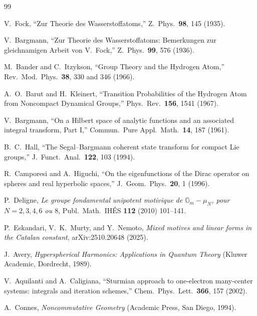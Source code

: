 \documentclass[aps,pra,twocolumn,superscriptaddress,longbibliography]{revtex4-2}
\begin{document}
\begin{thebibliography}{99}


V.~Fock,
``Zur Theorie des Wasserstoffatoms,''
Z.\ Phys.\ \textbf{98}, 145 (1935).

V.~Bargmann,
``Zur Theorie des Wasserstoffatoms: Bemerkungen zur gleichnamigen Arbeit von V.~Fock,''
Z.\ Phys.\ \textbf{99}, 576 (1936).

M.~Bander and C.~Itzykson,
``Group Theory and the Hydrogen Atom,''
Rev.\ Mod.\ Phys.\ \textbf{38}, 330 and 346 (1966).

A.~O.~Barut and H.~Kleinert,
``Transition Probabilities of the Hydrogen Atom from Noncompact Dynamical Groups,''
Phys.\ Rev.\ \textbf{156}, 1541 (1967).

V.~Bargmann,
``On a Hilbert space of analytic functions and an associated integral transform, Part I,''
Commun.\ Pure Appl.\ Math.\ \textbf{14}, 187 (1961).

B.~C.~Hall,
``The Segal--Bargmann coherent state transform for compact Lie groups,''
J.\ Funct.\ Anal.\ \textbf{122}, 103 (1994).

R.~Camporesi and A.~Higuchi,
``On the eigenfunctions of the Dirac operator on spheres and real hyperbolic spaces,''
J.\ Geom.\ Phys.\ \textbf{20}, 1 (1996).

P.~Deligne, \emph{Le groupe fondamental unipotent motivique de
$\mathbb{G}_m - \mu_N$, pour $N = 2, 3, 4, 6$ ou $8$}, Publ.\ Math.\ IH\'ES
\textbf{112} (2010) 101--141.

P.~Eskandari, V.~K.~Murty, and Y.~Nemoto, \emph{Mixed motives and
linear forms in the Catalan constant}, arXiv:2510.20648 (2025).

J.~Avery,
\textit{Hyperspherical Harmonics: Applications in Quantum Theory}
(Kluwer Academic, Dordrecht, 1989).

V.~Aquilanti and A.~Caligiana,
``Sturmian approach to one-electron many-center systems: integrals and iteration schemes,''
Chem.\ Phys.\ Lett.\ \textbf{366}, 157 (2002).

A.~Connes,
\textit{Noncommutative Geometry}
(Academic Press, San Diego, 1994).


\end{thebibliography}
\end{document}
